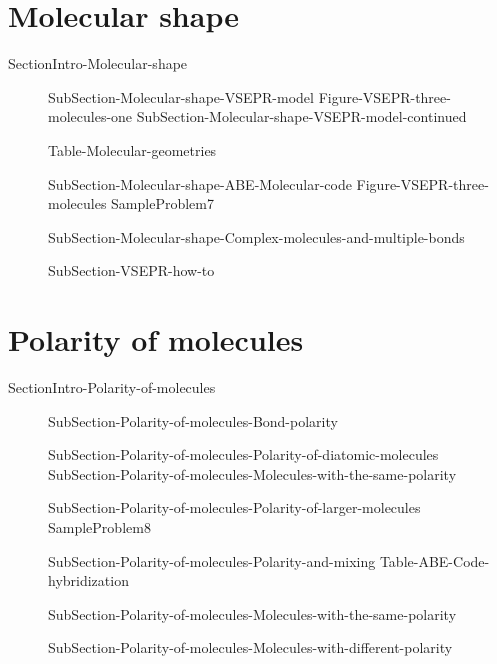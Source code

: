 \documentclass[main.tex]{subfiles}
\begin{document}
\section{Molecular shape}{SectionIntro-Molecular-shape}
\sloppy\begin{description}
\item[] {SubSection-Molecular-shape-VSEPR-model}
{Figure-VSEPR-three-molecules-one}
 {SubSection-Molecular-shape-VSEPR-model-continued}
 
     \label{Tab:{\chapterlabel}\thefigurenewcounter}
{Table-Molecular-geometries}
\item[] {SubSection-Molecular-shape-ABE-Molecular-code}
{Figure-VSEPR-three-molecules}
{SampleProblem7}
\item[] {SubSection-Molecular-shape-Complex-molecules-and-multiple-bonds}
\item[]{SubSection-VSEPR-how-to}  


\end{description}
\section{Polarity of molecules}{SectionIntro-Polarity-of-molecules}
\sloppy \begin{description}
\item[] {SubSection-Polarity-of-molecules-Bond-polarity}
\item[] {SubSection-Polarity-of-molecules-Polarity-of-diatomic-molecules}
{SubSection-Polarity-of-molecules-Molecules-with-the-same-polarity}
\item[] {SubSection-Polarity-of-molecules-Polarity-of-larger-molecules}
{SampleProblem8}
\item[] {SubSection-Polarity-of-molecules-Polarity-and-mixing}
{Table-ABE-Code-hybridization}
\item[] {SubSection-Polarity-of-molecules-Molecules-with-the-same-polarity}
\item[] {SubSection-Polarity-of-molecules-Molecules-with-different-polarity}
\end{description}
\end{document}
